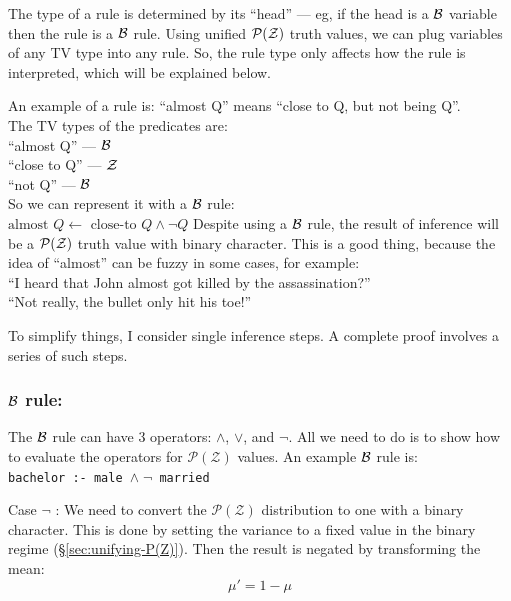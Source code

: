 The type of a rule is determined by its ``head'' --- eg, if the head is a $\mathcal{B}$ variable then the rule is a $\mathcal{B}$ rule.  Using unified $\mathcal{P(Z)}$ truth values, we can plug variables of any TV type into any rule.  So, the rule type only affects how the rule is interpreted, which will be explained below.

An example of a rule is:  ``almost Q'' means ``close to Q, but not being Q''.\\
The TV types of the predicates are:\\
\hspace*{1cm} ``almost Q'' --- $\mathcal{B}$\\
\hspace*{1cm} ``close to Q'' --- $\mathcal{Z}$\\
\hspace*{1cm} ``not Q'' --- $\mathcal{B}$\\
So we can represent it with a $\mathcal{B}$ rule:\\
\hspace*{1cm} $\mbox{almost } Q \leftarrow \mbox{ close-to } Q \wedge \neg Q$
Despite using a $\mathcal{B}$ rule, the result of inference will be a $\mathcal{P(Z)}$ truth value with binary character.  This is a good thing, because the idea of ``almost'' can be fuzzy in some cases, for example:\\
\hspace*{1cm} ``I heard that John almost got killed by the assassination?''\\
\hspace*{1cm} ``Not really, the bullet only hit his toe!''

To simplify things, I consider single inference steps.  A complete proof involves a series of such steps.

\subsubsection{$\mathcal{B}$ rule:}

The $\mathcal{B}$ rule can have 3 operators: $\wedge$, $\vee$, and $\neg$.  All we need to do is to show how to evaluate the operators for $\mathcal{P(Z)}$ values.  An example $\mathcal{B}$ rule is:\\
\hspace*{1cm} \texttt{bachelor :- male $\wedge \; \neg$ married}

Case $\neg$ :  We need to convert the $\mathcal{P(Z)}$ distribution to one with a binary character.  This is done by setting the variance to a fixed value in the binary regime (\S\ref{sec:unifying-P(Z)}).  Then the result is negated by transforming the mean:
\begin{equation}
\mu ' = 1 - \mu
\label{eqn:1-minus-z-transform}
\end{equation}

